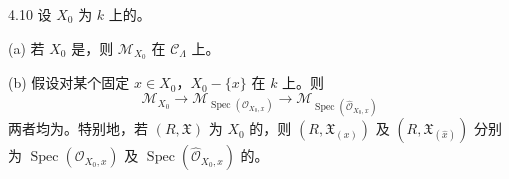 \begin{SGAresult}{}{4.10}
设 $X_0$ 为 $k$ 上的。

(a) 若 $X_0$ 是，则 $\mathcal M_{X_0}$ 在 $\mathcal C_\Lambda$ 上。

(b) 假设对某个固定 $x\in X_0$，$X_0-\{x\}$ 在 $k$ 上。则
\[
\mathcal M_{X_0}\longrightarrow\mathcal M_{\operatorname{Spec}(\mathcal O_{X_0,x})}
\longrightarrow\mathcal M_{\operatorname{Spec}(\widehat{\mathcal O}_{X_0,x})}
\]
两者均为。特别地，若 $(R,\mathfrak X)$ 为 $X_0$ 的，则 $(R,\mathfrak X_{(x)})$ 及 $(R,\mathfrak X_{(\widehat x)})$ 分别为 $\operatorname{Spec}(\mathcal O_{X_0,x})$ 及 $\operatorname{Spec}(\widehat{\mathcal O}_{X_0,x})$ 的。
\end{SGAresult}
